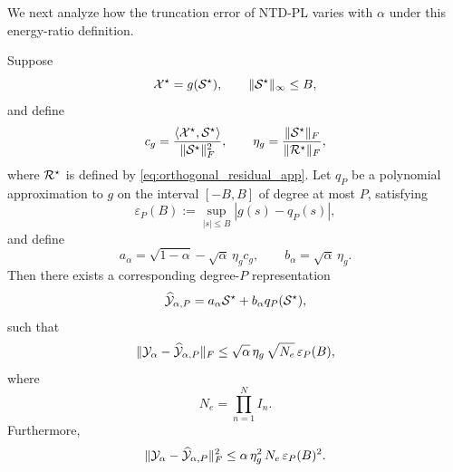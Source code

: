 We next analyze how the truncation error of NTD-PL varies with $\alpha$ under this energy-ratio definition.

\begin{corollary}
\label{cor:alpha_truncation_app}
Suppose
\begin{equation}
\mathcal{X}^\star = g(\mathcal{S}^\star),
\qquad
\|\mathcal{S}^\star\|_\infty \le B,
\end{equation}
and define
\begin{equation}
c_g
=
\frac{\langle \mathcal{X}^\star,\mathcal{S}^\star\rangle}{\|\mathcal{S}^\star\|_F^2},
\qquad
\eta_g
=
\frac{\|\mathcal{S}^\star\|_F}{\|\mathcal{R}^\star\|_F},
\end{equation}
where $\mathcal{R}^\star$ is defined by \eqref{eq:orthogonal_residual_app}. Let $q_P$ be a polynomial approximation to $g$ on the interval $[-B,B]$ of degree at most $P$, satisfying
\begin{equation}
\varepsilon_P(B)
:=
\sup_{|s|\le B}|g(s)-q_P(s)|,
\end{equation}
and define
\begin{equation}
a_\alpha=\sqrt{1-\alpha}-\sqrt{\alpha}\,\eta_g c_g,
\qquad
b_\alpha=\sqrt{\alpha}\,\eta_g.
\end{equation}
Then there exists a corresponding degree-$P$ representation
\begin{equation}
\widehat{\mathcal{Y}}_{\alpha,P}
=
a_\alpha \mathcal{S}^\star + b_\alpha q_P(\mathcal{S}^\star),
\end{equation}
such that
\begin{equation}
\|\mathcal{Y}_\alpha-\widehat{\mathcal{Y}}_{\alpha,P}\|_F
\le
\sqrt{\alpha}\,\eta_g\,\sqrt{N_e}\,\varepsilon_P(B),
\label{eq:alpha_truncation_bound_app}
\end{equation}
where
\begin{equation}
N_e=\prod_{n=1}^N I_n.
\end{equation}
Furthermore,
\begin{equation}
\|\mathcal{Y}_\alpha-\widehat{\mathcal{Y}}_{\alpha,P}\|_F^2
\le
\alpha\,\eta_g^2\,N_e\,\varepsilon_P(B)^2.
\label{eq:alpha_truncation_bound_sq_app}
\end{equation}
\end{corollary}

